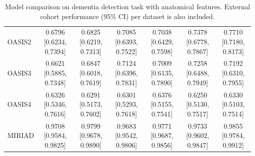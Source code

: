 \documentclass[pdflatex,sn-nature]{sn-jnl}%
\theoremstyle{thmstyleone}%
\theoremstyle{thmstyletwo}%
\theoremstyle{thmstylethree}%
\begin{document}
\begin{appendices}
\begin{table}[!ht]
\begin{tabular}{l|cc|cc|cc}
OASIS2 &
\makecell{0.6796 \\ {[0.6234, 0.7394]}} &
\makecell{0.6825 \\ {[0.6219, 0.7313]}} &
\makecell{0.7085 \\ {[0.6393, 0.7522]}} &
\makecell{0.7038 \\ {[0.6429, 0.7598]}} &
\makecell{0.7378 \\ {[0.6778, 0.7867]}} &
\makecell{0.7710 \\ {[0.7180, 0.8173]}} \\

OASIS3 &
\makecell{0.6621 \\ {[0.5885, 0.7348]}} &
\makecell{0.6847 \\ {[0.6018, 0.7619]}} &
\makecell{0.7124 \\ {[0.6396, 0.7831]}} &
\makecell{0.7009 \\ {[0.6135, 0.7890]}} &
\makecell{0.7258 \\ {[0.6488, 0.7949]}} &
\makecell{0.7192 \\ {[0.6310, 0.7955]}} \\

OASIS4 &
\makecell{0.6326 \\ {[0.5346, 0.7616]}} &
\makecell{0.6291 \\ {[0.5173, 0.7602]}} &
\makecell{0.6301 \\ {[0.5293, 0.7618]}} &
\makecell{0.6376 \\ {[0.5155, 0.7541]}} &
\makecell{0.6250 \\ {[0.5130, 0.7517]}} &
\makecell{0.6330 \\ {[0.5103, 0.7514]}} \\

MIRIAD &
\makecell{0.9708 \\ {[0.9584, 0.9825]}} &
\makecell{0.9799 \\ {[0.9678, 0.9890]}} &
\makecell{0.9683 \\ {[0.9542, 0.9806]}} &
\makecell{0.9771 \\ {[0.9687, 0.9856]}} &
\makecell{0.9733 \\ {[0.9602, 0.9847]}} &
\makecell{0.9855 \\ {[0.9784, 0.9912]}} \\

\bottomrule
\end{tabular}
\caption{Model comparison on dementia detection task with anatomical features. External cohort performance (95\% CI) per dataset is also included.}
\label{tab:lr_vs_rf_dementia}
\end{table}


\end{appendices}
\end{document}
